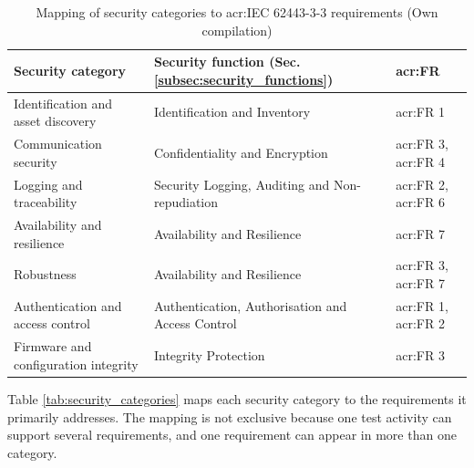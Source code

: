 \begin{table}[H] 
	\caption[Mapping of security categories to \gls{acr:IEC} 62443-3-3 requirements]{Mapping of security categories to \gls{acr:IEC} 62443-3-3 requirements (Own compilation)} 
	\label{tab:category_function_fr} 
	\centering 
	\begin{tabularx}{\textwidth}{X X l} 
		\toprule 
		\textbf{Security category} & \textbf{Security function (Sec. \ref{subsec:security_functions})} & \textbf{\gls{acr:FR}} \\ 
		\midrule 
		Identification and asset discovery & Identification and Inventory & \gls{acr:FR} 1 \\ 
		\addlinespace 
		Communication security & Confidentiality and Encryption & \gls{acr:FR} 3, \gls{acr:FR} 4 \\ 
		\addlinespace
		Logging and traceability & Security Logging, Auditing and Non-repudiation & \gls{acr:FR} 2, \gls{acr:FR} 6 \\ 
		\addlinespace 
		Availability and resilience & Availability and Resilience & \gls{acr:FR} 7 \\ 
		\addlinespace 
		Robustness & Availability and Resilience & \gls{acr:FR} 3, \gls{acr:FR} 7 \\ 
		\addlinespace 
		Authentication and access control & Authentication, \newline  Authorisation and Access Control & \gls{acr:FR} 1, \gls{acr:FR} 2 \\ 
		\addlinespace 
		Firmware and configuration integrity & Integrity Protection & \gls{acr:FR} 3 \\ 
		\bottomrule 
	\end{tabularx} 
\end{table} 

Table \ref{tab:security_categories} maps each security category to the requirements it primarily addresses. The mapping is not exclusive because one test activity can support several requirements, and one requirement can appear in more than one category.



